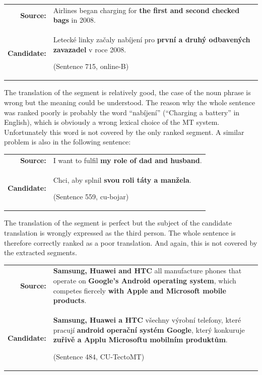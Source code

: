 \begin{center}
  \begin{tabular}{rp{11cm}}

    \textbf{Source:} & Airlines began charging for \textbf{the first and second
  checked bags} in 2008. \\

    \textbf{Candidate:} & Letecké linky začaly nabíjení pro \textbf{první a
  druhý odbavených zavazadel} v roce 2008.
  
  (Sentence 715, online-B) \\

  \end{tabular}
\end{center}

\noindent The translation of the segment is relatively good, the case of the
noun phrase is wrong but the meaning could be understood. The reason why the
whole sentence was ranked poorly is probably the word ``nabíjení'' (``Charging
a battery'' in English), which is obviously a wrong lexical choice of the MT
system. Unfortunately this word is not covered by the only ranked segment. A
similar problem is also in the following sentence:

\begin{center}
  \begin{tabular}{rp{11cm}}

    \textbf{Source:} & I want to fulfil \textbf{my role of dad and husband}. \\

    \textbf{Candidate:} & Chci, aby splnil \textbf{svou roli táty a manžela}.
    
    (Sentence 559, cu-bojar) \\

  \end{tabular}
\end{center}

\noindent The translation of the segment is perfect but the subject of the
candidate translation is wrongly expressed as the third person. The whole
sentence is therefore correctly ranked as a poor translation. And again, this is
not covered by the extracted segments.

\begin{center}
  \begin{tabular}{rp{11cm}}

    \textbf{Source:} & \textbf{Samsung, Huawei and HTC} all manufacture phones
    that operate on \textbf{Google's Android operating system}, which competes
    fiercely \textbf{with Apple and Microsoft mobile products}. \\

    \textbf{Candidate:} & \textbf{Samsung, Huawei a HTC} všechny výrobní
    telefony, které pracují \textbf{android operační systém Google}, který
    konkuruje \textbf{zuřivě a Applu Microsoftu mobilním produktům}.
    
    (Sentence 484, CU-TectoMT) \\

  \end{tabular}
\end{center}

